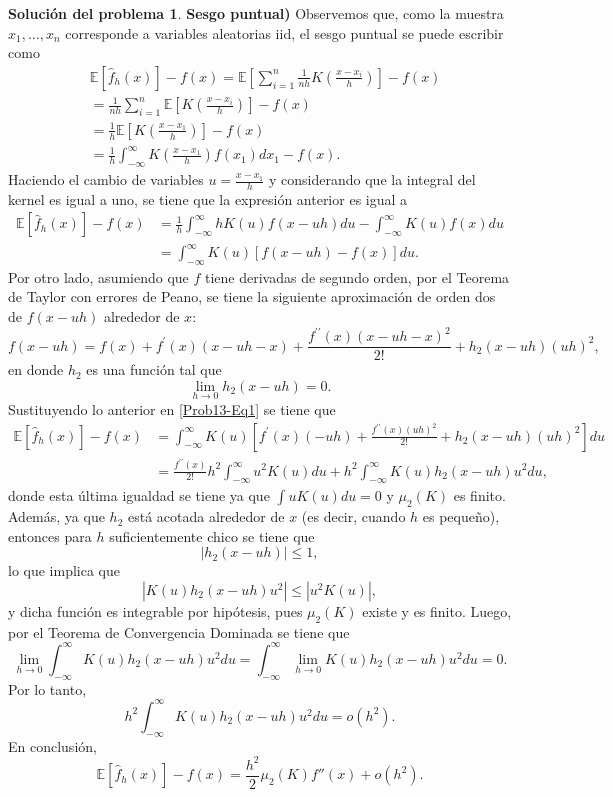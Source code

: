 \documentclass[twoside,12pt]{article}
\theoremstyle{definition}
\newtheorem{soln}{Solución del problema}
\begin{document}
\begin{soln}
\textbf{Sesgo puntual)} Observemos que, como la muestra $x_1, \ldots, x_n$ corresponde a variables aleatorias iid, el sesgo puntual se puede escribir como
\[
\begin{split}
  & \mathbb{E}\left[\hat{f}_h(x)\right]-f(x)=\mathbb{E}\left[\sum_{i=1}^n \frac{1}{n h} K\left(\frac{x-x_i}{h}\right)\right]-f(x) \\
  &=  \frac{1}{n h} \sum_{i=1}^n \mathbb{E}\left[K\left(\frac{x-x_i}{h}\right)\right]-f(x) \\
  &=  \frac{1}{h} \mathbb{E}\left[K\left(\frac{x-x_1}{h}\right)\right]-f(x) \\
  &=  \frac{1}{h} \int_{-\infty}^{\infty} K\left(\frac{x-x_1}{h}\right) f\left(x_1\right) d x_1-f(x).
\end{split}
\] 
Haciendo el cambio de variables $u=\frac{x-x_1}{h}$ y considerando que la integral del kernel es igual a uno, se tiene que la expresión anterior es igual a
\begin{equation}\label{Prob13-Eq1}
  \begin{split}
  \mathbb{E}\left[\hat{f}_h(x)\right]-f(x) &= \frac{1}{h} \int_{-\infty}^{\infty} h K(u) f(x-u h) d u-\int_{-\infty}^{\infty} K(u) f(x) d u \\
  & = \int_{-\infty}^{\infty} K(u)[f(x-u h)-f(x)] d u.
\end{split}
\end{equation}
Por otro lado, asumiendo que $f$ tiene derivadas de segundo orden, por el Teorema de Taylor con errores de Peano, se tiene la siguiente aproximación de orden dos de $f(x-uh)$ alrededor de $x$:
\[
f(x-u h)=f(x)+f^{\prime}(x)(x-u h-x)+\frac{f^{\prime \prime}(x){(x-u h-x)}^2}{2!}+h_2(x-uh){(uh)}^2,
\]
en donde $h_2$ es una función tal que
\[
\lim_{h\to 0}h_2(x-uh)=0.
\]
Sustituyendo lo anterior en \eqref{Prob13-Eq1} se tiene que
\[
\begin{split}
  \mathbb{E}\left[\hat{f}_h(x)\right]-f(x) &= \int_{-\infty}^{\infty} K(u)\left[f^{\prime}(x)(-u h)+\frac{f^{\prime \prime}(x){(u h)}^2}{2!}+h_2(x-uh){(uh)}^2\right] d u \\
  &=  \frac{f^{\prime \prime}(x)}{2!} h^2 \int_{-\infty}^{\infty} u^2 K(u) d u+h^2 \int_{-\infty}^{\infty} K(u) h_2(x-uh) u^2  d u,
\end{split}
\]
donde esta última igualdad se tiene ya que $\int uK(u)du=0$ y $\mu_2(K)$ es finito. Además, ya que $h_2$ está acotada alrededor de $x$ (es decir, cuando $h$ es pequeño), entonces para $h$ suficientemente chico se tiene que
\[
\left\lvert h_2(x-uh) \right\rvert \leq 1,
\]
lo que implica que
\[
\left\lvert K(u) h_2(x-uh) u^2 \right\rvert \leq \left\lvert u^2 K(u) \right\rvert,
\]
y dicha función es integrable por hipótesis, pues $\mu_2(K)$ existe y es finito. Luego, por el Teorema de Convergencia Dominada se tiene que
\[
\lim_{h\to 0} \int_{-\infty}^{\infty} K(u) h_2(x-uh) u^2  d u = \int_{-\infty}^{\infty} \lim_{h\to 0} K(u) h_2(x-uh) u^2  d u = 0.
\]
Por lo tanto,
\[
h^2 \int_{-\infty}^{\infty} K(u) h_2(x-uh) u^2  d u = o(h^2).
\]
En conclusión,
\[
\mathbb{E}\left[\hat{f}_h(x)\right]-f(x) = \frac{h^2}{2}\mu_2(K)f''(x)+o(h^2).
\]
\end{soln}
\end{document}
